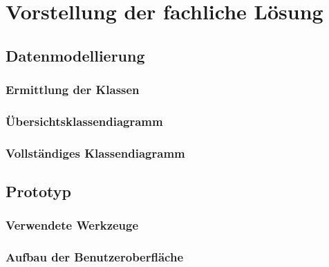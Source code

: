 \documentclass[12pt, titlepage]{article}
\begin{document}


\doublespacing
















\section{Vorstellung der fachliche Lösung}
\subsection{Datenmodellierung}
\subsubsection{Ermittlung der Klassen}
\subsubsection{Übersichtsklassendiagramm}
\subsubsection{Vollständiges Klassendiagramm}

\subsection{Prototyp}
\subsubsection{Verwendete Werkzeuge}
\subsubsection{Aufbau der Benutzeroberfläche}
\end{document}
